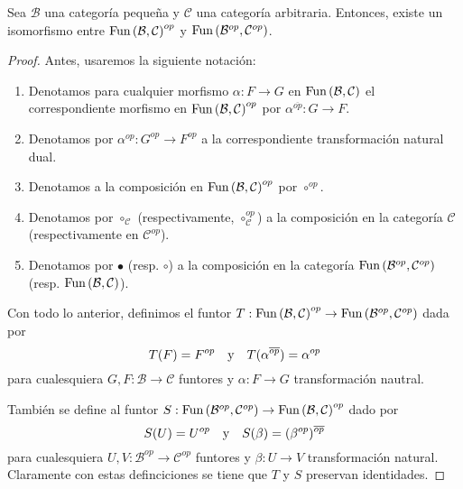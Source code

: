 \documentclass[12pt]{report}
\theoremstyle{largebreak}
\newcommand\cf[3]{\ensuremath{#1:#2\rightarrow#3}}
\newcommand{\Fun}[2]{\ensuremath{\textup{Fun}\left(#1,#2\right)}}
\begin{document}
    \begin{propo}
        Sea $\mathcal{B}$ una categoría pequeña y $\mathcal{C}$ una categoría arbitraria. Entonces, existe un isomorfismo entre $\Fun{\mathcal{B}}{\mathcal{C}}^{op}$ y $\Fun{\mathcal{B}^{op}}{\mathcal{C}^{op}}$.
    \end{propo}

    \begin{proof}
        Antes, usaremos la siguiente notación:
        \begin{enumerate}
            \item Denotamos para cualquier morfismo $\cf{\alpha}{F}{G}$ en $\Fun{\mathcal{B}}{\mathcal{C}}$ el correspondiente morfismo en $\Fun{\mathcal{B}}{\mathcal{C}}^{op}$ por $\cf{\alpha^{\overline{op}}}{G}{F}$.
            \item Denotamos por $\cf{\alpha^{op}}{G^{op}}{F^{op}}$ a la correspondiente transformación natural dual.
            \item Denotamos a la composición en $\Fun{\mathcal{B}}{\mathcal{C}}^{op}$ por $\circ^{op}$.
            \item Denotamos por $\circ_{\mathcal{C}}$ (respectivamente, $\circ_{\mathcal{C}}^{op}$) a la composición en la categoría $\mathcal{C}$ (respectivamente en $\mathcal{C}^{op}$).
            \item Denotamos por $\bullet$ (resp. $\circ$) a la composición en la categoría $\Fun{\mathcal{B}^{op}}{\mathcal{C}^{op}}$ (resp. $\Fun{\mathcal{B}}{\mathcal{C}}$).
        \end{enumerate}

        Con todo lo anterior, definimos el funtor $\cf{T}{\Fun{\mathcal{B}}{\mathcal{C}}^{op}}{\Fun{\mathcal{B}^{op}}{\mathcal{C}^{op}}}$ dada por
        \begin{equation*}
            T(F)=F^{op}\quad\textup{y}\quad T(\alpha^{\overline{op}})=\alpha^{op}
        \end{equation*}
        para cualesquiera $\cf{G,F}{\mathcal{B}}{\mathcal{C}}$ funtores y $\cf{\alpha}{F}{G}$ transformación nautral.

        También se define al funtor $\cf{S}{\Fun{\mathcal{B}^{op}}{\mathcal{C}^{op}}}{\Fun{\mathcal{B}}{\mathcal{C}}^{op}}$ dado por
        \begin{equation*}
            S(U)=U^{op}\quad\textup{y}\quad S(\beta)=(\beta^{op})^{\overline{op}}
        \end{equation*}
        para cualesquiera $\cf{U,V}{\mathcal{B}^{op}}{\mathcal{C}^{op}}$ funtores y $\cf{\beta}{U}{V}$ transformación natural. Claramente con estas definciciones se tiene que $T$ y $S$ preservan identidades.


\end{proof}
\end{document}
